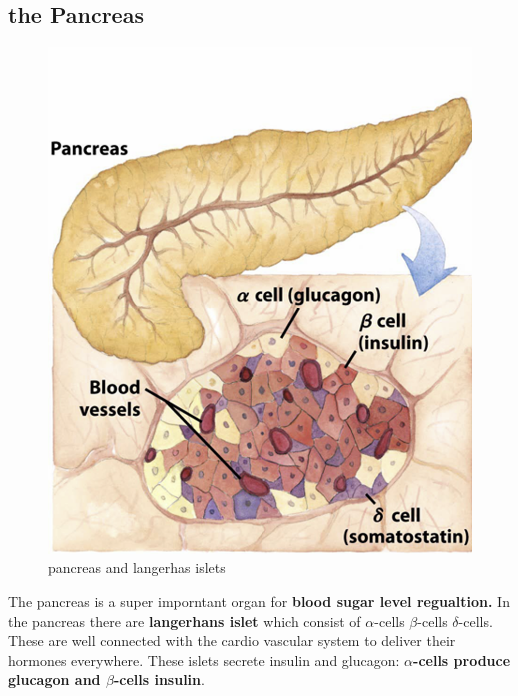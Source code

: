 \documentclass[../main.tex]{subfiles}
\begin{document}
\subsection{the Pancreas}
\begin{figure}[H]
    \centering
    \includegraphics[width=0.5\linewidth]{pancreas.png}
    \caption{pancreas and langerhas islets}
    \label{fig:enter-label}
\end{figure}
The pancreas is a super imporntant organ for\textbf{ blood sugar level regualtion.} In the pancreas there are \textbf{langerhans islet }which consist of $\alpha$-cells $\beta$-cells $\delta$-cells. These are well connected with the cardio vascular system to deliver their hormones everywhere. These islets secrete insulin and glucagon: \textbf{$\alpha$-cells  produce glucagon and $\beta$-cells insulin}.
\end{document}
